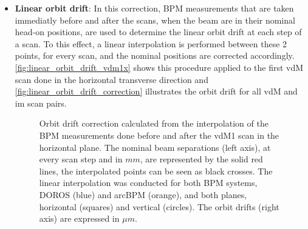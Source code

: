 \begin{itemize}
	\item \textbf{Linear orbit drift}: In this correction, BPM measurements that are taken immediatly before and after the scans, when the beam are in their nominal head-on positions, are used to determine the linear orbit drift at each step of a scan. To this effect, a linear interpolation is performed between these 2 points, for every scan, and the nominal positions are corrected accordingly. \autoref{fig:linear_orbit_drift_vdm1x} shows this procedure applied to the first vdM scan done in the horizontal transverse direction and \autoref{fig:linear_orbit_drift_correction} illustrates the orbit drift for all vdM and im scan pairs.

	\begin{figure}[!htb]
		\centering
		\caption[Orbit drift correction calculation]{Orbit drift correction calculated from the interpolation of the BPM measurements done before and after the vdM1 scan in the horizontal plane. The nominal beam separations (left axis), at every scan step and in $mm$,  are represented by the solid red lines, the interpolated points can be seen as black crosses. The linear interpolation was conducted for both BPM systems, DOROS (blue) and arcBPM (orange), and both planes, horizontal (squares) and vertical (circles). The orbit drifts (right axis) are expressed in $\mu m$.}
		\label{fig:linear_orbit_drift_vdm1x}
	\end{figure}


\end{itemize}
